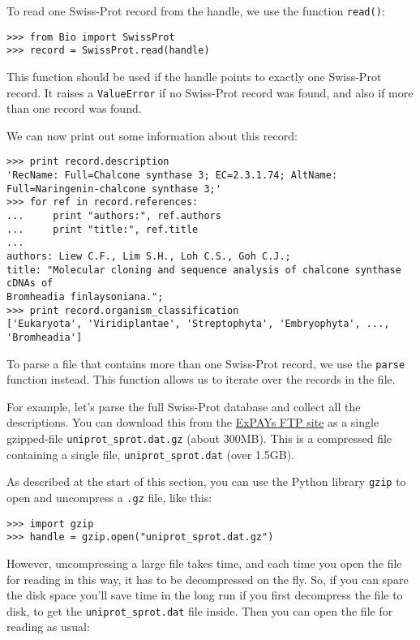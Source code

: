\documentclass{report}
\begin{document}
To read one Swiss-Prot record from the handle, we use the function \verb|read()|:
\begin{verbatim}
>>> from Bio import SwissProt
>>> record = SwissProt.read(handle)
\end{verbatim}
This function should be used if the handle points to exactly one Swiss-Prot record. It raises a \verb|ValueError| if no Swiss-Prot record was found, and also if more than one record was found.

We can now print out some information about this record:
\begin{verbatim}
>>> print record.description
'RecName: Full=Chalcone synthase 3; EC=2.3.1.74; AltName: Full=Naringenin-chalcone synthase 3;'
>>> for ref in record.references:
...     print "authors:", ref.authors
...     print "title:", ref.title
...
authors: Liew C.F., Lim S.H., Loh C.S., Goh C.J.;
title: "Molecular cloning and sequence analysis of chalcone synthase cDNAs of
Bromheadia finlaysoniana.";
>>> print record.organism_classification
['Eukaryota', 'Viridiplantae', 'Streptophyta', 'Embryophyta', ..., 'Bromheadia']
\end{verbatim}

To parse a file that contains more than one Swiss-Prot record, we use the \verb|parse| function instead. This function allows us to iterate over the records in the file.

For example, let's parse the full Swiss-Prot database and collect all the descriptions.
You can download this from the \href{ftp://ftp.expasy.org/databases/uniprot/current_release/knowledgebase/complete/uniprot_sprot.dat.gz}{ExPAYs FTP site} as a single gzipped-file \verb|uniprot_sprot.dat.gz| (about 300MB).  This is a compressed file containing a single file, \verb|uniprot_sprot.dat| (over 1.5GB).

As described at the start of this section, you can use the Python library \verb|gzip| to open and uncompress a \texttt{.gz} file, like this:

\begin{verbatim}
>>> import gzip
>>> handle = gzip.open("uniprot_sprot.dat.gz")
\end{verbatim}

However, uncompressing a large file takes time, and each time you open the file for reading in this way, it has to be decompressed on the fly.  So, if you can spare the disk space you'll save time in the long run if you first decompress the file to disk, to get the \verb|uniprot_sprot.dat| file inside.  Then you can open the file for reading as usual:
\end{document}
